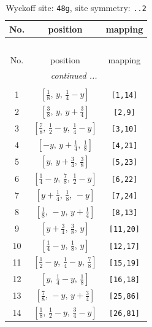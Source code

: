 \documentclass[fleqn,8pt]{jsarticle}
\begin{document}
\begin{longtable}{ccc}
\caption{Wyckoff site: {\tt 48g}, site symmetry: {\tt ..2}}
 \\
 \hline \hline
No. & position & mapping \\ \hline \endfirsthead

\multicolumn{2}{l}{\tablename\ \thetable{}} \\
 \hline \hline
No. & position & mapping \\ \hline \endhead

 \hline \hline
\multicolumn{2}{r}{\footnotesize\it continued ...} \\ \endfoot

 \hline \hline
\multicolumn{2}{r}{} \\ \endlastfoot

1 & $\left[ \frac{1}{8},\, y,\, \frac{1}{4} - y \right]$ & {\tt [1,14]} \\ \hline
2 & $\left[ \frac{3}{8},\, y,\, y + \frac{3}{4} \right]$ & {\tt [2,9]} \\ \hline
3 & $\left[ \frac{7}{8},\, \frac{1}{2} - y,\, \frac{1}{4} - y \right]$ & {\tt [3,10]} \\ \hline
4 & $\left[ - y,\, y + \frac{1}{4},\, \frac{1}{8} \right]$ & {\tt [4,21]} \\ \hline
5 & $\left[ y,\, y + \frac{3}{4},\, \frac{3}{8} \right]$ & {\tt [5,23]} \\ \hline
6 & $\left[ \frac{1}{4} - y,\, \frac{7}{8},\, \frac{1}{2} - y \right]$ & {\tt [6,22]} \\ \hline
7 & $\left[ y + \frac{1}{4},\, \frac{1}{8},\, - y \right]$ & {\tt [7,24]} \\ \hline
8 & $\left[ \frac{1}{8},\, - y,\, y + \frac{1}{4} \right]$ & {\tt [8,13]} \\ \hline
9 & $\left[ y + \frac{3}{4},\, \frac{3}{8},\, y \right]$ & {\tt [11,20]} \\ \hline
10 & $\left[ \frac{1}{4} - y,\, \frac{1}{8},\, y \right]$ & {\tt [12,17]} \\ \hline
11 & $\left[ \frac{1}{2} - y,\, \frac{1}{4} - y,\, \frac{7}{8} \right]$ & {\tt [15,19]} \\ \hline
12 & $\left[ y,\, \frac{1}{4} - y,\, \frac{1}{8} \right]$ & {\tt [16,18]} \\ \hline
13 & $\left[ \frac{7}{8},\, - y,\, y + \frac{3}{4} \right]$ & {\tt [25,86]} \\ \hline
14 & $\left[ \frac{1}{8},\, \frac{1}{2} - y,\, \frac{3}{4} - y \right]$ & {\tt [26,81]} \\ \hline

\end{longtable}
\end{document}
